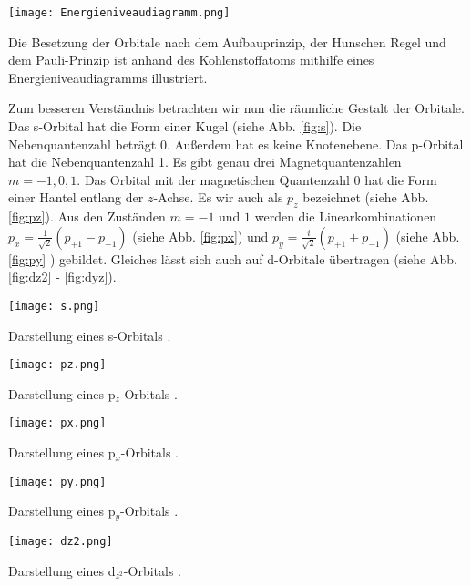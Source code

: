 \begin{dsafigure}
 \centering
 \texttt{[image: Energieniveaudiagramm.png]}
 \caption{Die Besetzung der Orbitale nach dem Aufbauprinzip, der Hunschen Regel und dem Pauli-Prinzip ist anhand des Kohlenstoffatoms mithilfe eines Energieniveaudiagramms illustriert.}
 \label{fig:Energieniveaudiagramm}
\end{dsafigure}

Zum besseren Verständnis betrachten wir nun die räumliche Gestalt der Orbitale. Das s-Orbital hat die Form einer Kugel (siehe Abb. \ref{fig:s}). Die Nebenquantenzahl beträgt $0$. Außerdem hat es keine Knotenebene. Das p-Orbital hat die Nebenquantenzahl 1. Es gibt genau drei Magnetquantenzahlen $m = -1, 0, 1$. Das Orbital mit der magnetischen Quantenzahl $0$ hat die Form einer Hantel entlang der $z$-Achse. Es wir auch als $p_{z}$ bezeichnet (siehe Abb. \ref{fig:pz}). Aus den Zuständen $m = -1$ und $1$ werden die Linearkombinationen $p_{x} = \frac{1}{\sqrt{2}} (p_{+1} - p_{-1})$ (siehe Abb. \ref{fig:px}) und $p_{y} = \frac{i}{\sqrt{2}}(p_{+1}+p_{-1})$ (siehe Abb. \ref{fig:py} ) gebildet. Gleiches lässt sich auch auf d-Orbitale übertragen (siehe Abb. \ref{fig:dz2} - \ref{fig:dyz}).

\begin{dsafigure}
 \centering
 \texttt{[image: s.png]}
 \caption{Darstellung eines s-Orbitals \cite{ADF2017authors}.}
 \label{fig:s}
\end{dsafigure}

\begin{dsafigure}
 \centering
 \texttt{[image: pz.png]}
 \caption{Darstellung eines p$_{z}$-Orbitals \cite{ADF2017authors}.}
 \label{fig:pz}
\end{dsafigure}

\begin{dsafigure}
 \centering
 \texttt{[image: px.png]}
 \caption{Darstellung eines p$_{x}$-Orbitals \cite{ADF2017authors}.}
 \label{fig:px}
\end{dsafigure}

\begin{dsafigure}
 \centering
 \texttt{[image: py.png]}
 \caption{Darstellung eines p$_{y}$-Orbitals \cite{ADF2017authors}.}
 \label{fig:py}
\end{dsafigure}

\begin{dsafigure}
 \centering
 \texttt{[image: dz2.png]}
 \caption{Darstellung eines d$_{z^{2}}$-Orbitals \cite{ADF2017authors}.}
 \label{fig:dz2}
\end{dsafigure}


